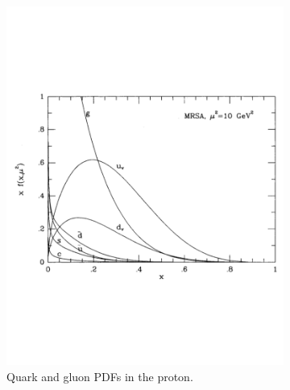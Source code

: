 \documentclass[11pt, oneside]{article}   	%
\theoremstyle{definition}
\numberwithin{equation}{subsection}		%
\begin{document}
\begin{figure}[H]
	\centering
	\begin{subfigure}[t]{.45\textwidth}
		\centering
		\includegraphics[width = \textwidth]{proton_pdfs}
		\caption{Quark and gluon PDFs in the proton.}
		\label{subfig:proton_pdfs}
	\end{subfigure}
	~
	\begin{subfigure}[t]{.45\textwidth}
		\centering

\end{subfigure}
\end{figure}
\end{document}
